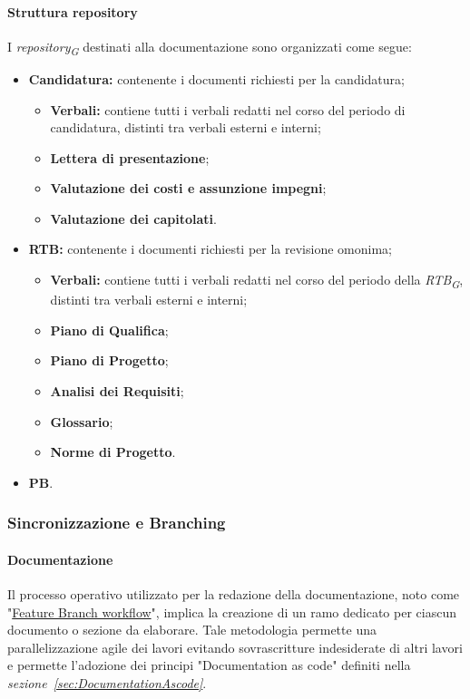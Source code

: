 \paragraph{Struttura repository}
I \textit{repository}\textsubscript{\textit{G}} destinati alla documentazione sono organizzati come segue:
\begin{itemize}
    \item \textbf{Candidatura:} contenente i documenti richiesti per la candidatura;
          \begin{itemize}
              \item \textbf{Verbali:} contiene tutti i verbali redatti nel corso del periodo di candidatura, distinti tra verbali esterni e interni;
              \item \textbf{Lettera di presentazione};
              \item \textbf{Valutazione dei costi e assunzione impegni};
              \item \textbf{Valutazione dei capitolati}.
          \end{itemize}
    \item \textbf{RTB:} contenente i documenti richiesti per la revisione omonima;
          \begin{itemize}
              \item \textbf{Verbali:} contiene tutti i verbali redatti nel corso del periodo della \textit{RTB}\textsubscript{\textit{G}}, distinti tra verbali esterni e interni;
              \item \textbf{Piano di Qualifica};
              \item \textbf{Piano di Progetto};
              \item \textbf{Analisi dei Requisiti};
              \item \textbf{Glossario};
              \item \textbf{Norme di Progetto}.
          \end{itemize}
    \item \textbf{PB}.
\end{itemize}


\hypertarget{subsubsec:sincronizzazione&branching}{\subsubsection{Sincronizzazione e Branching}}
\paragraph{Documentazione}
Il processo operativo utilizzato per la redazione della documentazione, noto come "\href{https://www.atlassian.com/git/tutorials/comparing-workflows/feature-branch-workflow}{Feature Branch workflow}", implica la creazione di un ramo dedicato per ciascun documento o sezione da elaborare.
Tale metodologia permette una parallelizzazione agile dei lavori evitando sovrascritture indesiderate di altri lavori e permette l'adozione dei principi "Documentation as code" definiti nella \textit{sezione~\ref{sec:DocumentationAscode}}. \\ 


